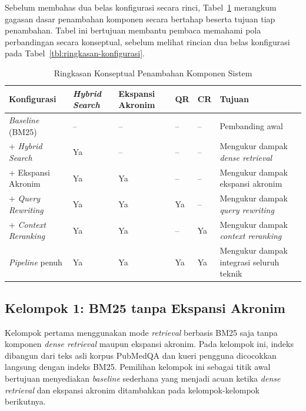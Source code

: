 Sebelum membahas dua belas konfigurasi secara rinci, Tabel~\ref{tbl:konfigurasi-konseptual} merangkum gagasan dasar penambahan komponen secara bertahap beserta tujuan tiap penambahan. Tabel ini bertujuan membantu pembaca memahami pola perbandingan secara konseptual, sebelum melihat rincian dua belas konfigurasi pada Tabel~\ref{tbl:ringkasan-konfigurasi}.

\begin{table}[H]
\centering
\small
\setlength{\tabcolsep}{4pt}
\renewcommand{\arraystretch}{1.3}
\caption{Ringkasan Konseptual Penambahan Komponen Sistem}
\label{tbl:konfigurasi-konseptual}
\begin{tabular}{|p{2.7cm}|>{\centering\arraybackslash}p{1.4cm}|>{\centering\arraybackslash}p{1.6cm}|>{\centering\arraybackslash}p{0.7cm}|>{\centering\arraybackslash}p{0.7cm}|p{3.6cm}|}
\hline
\textbf{Konfigurasi} & \textbf{\textit{Hybrid Search}} & \textbf{Ekspansi Akronim} & \textbf{QR} & \textbf{CR} & \textbf{Tujuan} \\ \hline
\textit{Baseline} (BM25) & -- & -- & -- & -- & Pembanding awal \\ \hline
+ \textit{Hybrid Search} & Ya & -- & -- & -- & Mengukur dampak \textit{dense retrieval} \\ \hline
+ Ekspansi Akronim & Ya & Ya & -- & -- & Mengukur dampak ekspansi akronim \\ \hline
+ \textit{Query Rewriting} & Ya & Ya & Ya & -- & Mengukur dampak \textit{query rewriting} \\ \hline
+ \textit{Context Reranking} & Ya & Ya & -- & Ya & Mengukur dampak \textit{context reranking} \\ \hline
\textit{Pipeline} penuh & Ya & Ya & Ya & Ya & Mengukur dampak integrasi seluruh teknik \\ \hline
\end{tabular}
\renewcommand{\arraystretch}{1.0}
\end{table}

\subsection{Kelompok 1: BM25 tanpa Ekspansi Akronim}
\label{subsec:kelompok-bm25}

Kelompok pertama menggunakan mode \textit{retrieval} berbasis BM25 saja tanpa komponen \textit{dense retrieval} maupun ekspansi akronim. Pada kelompok ini, indeks dibangun dari teks asli korpus PubMedQA dan kueri pengguna dicocokkan langsung dengan indeks BM25. Pemilihan kelompok ini sebagai titik awal bertujuan menyediakan \textit{baseline} sederhana yang menjadi acuan ketika \textit{dense retrieval} dan ekspansi akronim ditambahkan pada kelompok-kelompok berikutnya.

